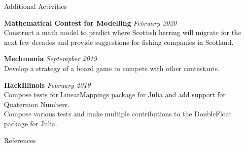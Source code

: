 \documentclass{cv} %
\begin{document}
\begin{rSection}{Additional Activities}

{\bf Mathematical Contest for Modelling} \hfill {\em February 2020}
\\ \textbullet{} Construct a math model to predict where Scottish herring will migrate for the next few decades and provide suggestions for fishing companies in Scotland.

{\bf Mechmania} \hfill {\em Septempber 2019}
\\ \textbullet{} Develop a strategy of a board game to compete with other contestants.

{\bf HackIllinois} \hfill {\em February 2019}
\\ \textbullet{} Compose tests for LinearMappings package for Julia and add support for Quaternion Numbers.
\\ \textbullet{} Compose various tests and make multiple contributions to the DoubleFloat package for Julia.


\end{rSection}

\begin{rSection} {References}

\end{rSection}




\end{document}
